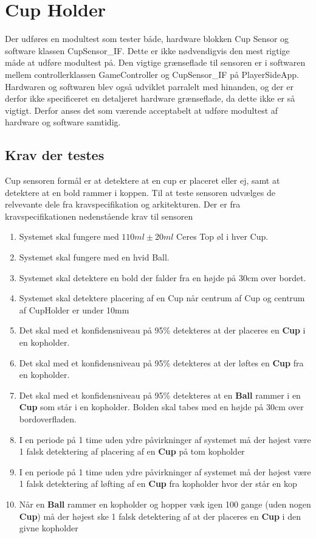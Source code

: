 \documentclass[Modultest/Modultest_main.tex]{subfiles}
\begin{document}
\section{Cup Holder}
Der udføres en modultest som tester både, hardware blokken Cup Sensor og software klassen CupSensor\_IF. Dette er ikke nødvendigvis den mest rigtige måde at udføre modultest på. Den vigtige grænseflade til sensoren er i softwaren mellem controllerklassen GameController og CupSensor\_IF på PlayerSideApp. Hardwaren og softwaren blev også udviklet parralelt med hinanden, og der er derfor ikke specificeret en detaljeret hardware grænseflade, da dette ikke er så vigtigt. Derfor anses det som værende acceptabelt at udføre modultest af hardware og software samtidig.

\subsection{Krav der testes}
Cup sensoren formål er at detektere at en cup er placeret eller ej, samt at detektere at en bold rammer i koppen. Til at teste sensoren udvælges de relvevante dele fra kravspecifikation og arkitekturen. Der er fra kravspecifikationen nedenstående krav til sensoren
\begin{enumerate}
    \item Systemet skal fungere med $110\si{ml} \pm 20\si{ml}$ Ceres Top øl i hver Cup. \label{itm:beer_type_and_volume}
    \item  Systemet skal fungere med en hvid Ball. \label{itm:ball_color}
    \item Systemet skal detektere en bold der falder fra en højde på 30cm over bordet. \label{itm:ball_drop_height}
    \item Systemet skal detektere placering af en Cup når centrum af Cup og centrum af CupHolder er under 10mm \label{itm:placing_radius}
    \item  Det skal med et konfidensniveau på 95\% detekteres at der placeres en \textbf{Cup} i en kopholder. \label{itm:placing_confidence}
    \item Det skal med et konfidensniveau på 95\% detekteres at der løftes en \textbf{Cup} fra en kopholder. \label{itm:removing_confidence}
    \item Det skal med et konfidensniveau på 95\% detekteres at en \textbf{Ball} rammer i  en \textbf{Cup} som står i en kopholder. Bolden skal tabes med en højde på 30cm over bordoverfladen.\label{itm:ball_drop_confidence}
    \item I en periode på 1 time uden ydre påvirkninger af systemet må der højest være 1 falsk detektering af placering af en \textbf{Cup} på tom kopholder \label{itm:placing_false_detection}
    \item I en periode på 1 time uden ydre påvirkninger af systemet må der højest være 1 falsk detektering af løfting af en \textbf{Cup} fra kopholder hvor der står en kop\label{itm:removing_false_detection}
    \item Når en \textbf{Ball} rammer en kopholder og hopper væk igen 100 gange (uden nogen \textbf{Cup}) må der højest ske 1 falsk detektering af at der placeres en \textbf{Cup} i den givne kopholder\label{itm:placing_false_detection_ball_bounce}
\end{enumerate}
\end{document}
